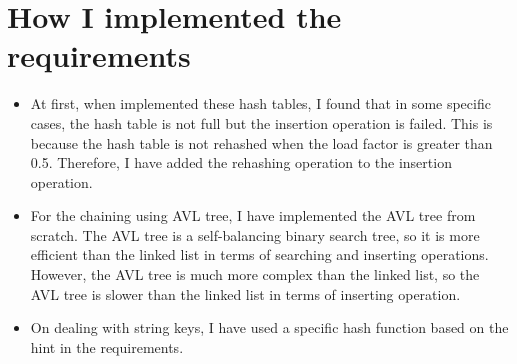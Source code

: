 \section{How I implemented the requirements}
\begin{itemize}
	\item At first, when implemented these hash tables, I found that in some specific cases, the hash table is not full but the insertion operation is failed. This is because the hash table is not rehashed when the load factor is greater than 0.5. Therefore, I have added the rehashing operation to the insertion operation.
	\item For the chaining using AVL tree, I have implemented the AVL tree from scratch. The AVL tree is a self-balancing binary search tree, so it is more efficient than the linked list in terms of searching and inserting operations. However, the AVL tree is much more complex than the linked list, so the AVL tree is slower than the linked list in terms of inserting operation.
	\item On dealing with string keys, I have used a specific hash function based on the hint in the requirements.
\end{itemize}